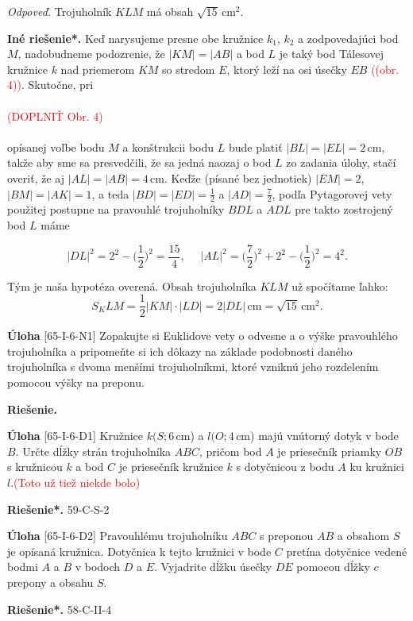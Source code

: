 \documentclass{article}
\newcommand{\rie}{\textbf{Riešenie.} }
\newcommand{\rieh}{\textbf{Riešenie*.} }
\newcommand\todo[1]{\noindent\textcolor{red}{(#1)}}
\newcommand{\problem}[4]{
  \begin{tcolorbox}[breakable,notitle,boxrule=0pt,colback=light-gray,colframe=light-gray]
    \textbf{Úloha}
    [#1] #3
  \end{tcolorbox}
  \noindent#4
}
\begin{document}
{\textit{Odpoveď.} Trojuholník $KLM$ má obsah $\sqrt{15}$\,cm$^2$.

\textbf{Iné riešenie*.} Keď narysujeme presne obe kružnice $k_1$, $k_2$ a zodpovedajúci bod $M$, nadobudneme podozrenie, že $|KM| = |AB|$ a bod $L$ je taký bod Tálesovej kružnice $k$ nad priemerom $KM$ so stredom $E$, ktorý leží na osi úsečky $EB$ \todo{(obr. 4)}. Skutočne, pri\\
\\
\todo{DOPLNIŤ Obr. 4}\\
\\
opísanej voľbe bodu $M$ a konštrukcii bodu $L$ bude platiť $|BL| = |EL| = 2$\,cm, takže aby sme sa presvedčili, že sa jedná naozaj o bod $L$ zo zadania úlohy, stačí overiť, že aj $|AL| = |AB| = 4$\,cm. Keďže (písané bez jednotiek) $|EM| = 2$, $|BM| = |AK| = 1$, a teda $|BD| = |ED| =\frac{1}{2}$ a $|AD| =\frac{7}{2}$, podľa Pytagorovej vety použitej postupne na pravouhlé trojuholníky $BDL$ a $ADL$ pre takto zostrojený bod $L$ máme

$$|DL|^2 = 2^2 - \bigg( \frac{1}{2}\bigg)^2=\frac{15}{4}, \ \ \ \ \ \ |AL|^2=\bigg(\frac{7}{2}\bigg)^2+ 2^2 - \bigg(\frac{1}{2}\bigg)^2= 4^2.$$

Tým je naša hypotéza overená. Obsah trojuholníka $KLM$ už spočítame ľahko:
$$S_KLM =\frac{1}{2}|KM| \cdot |LD| = 2|DL|\,\text{cm} =\sqrt{15}\,\text{cm}^2.$$
}



\problem{65-I-6-N1}{}{
Zopakujte si Euklidove vety o odvesne a o výške pravouhlého trojuholníka a pripomeňte si ich dôkazy na základe podobnosti daného trojuholníka s dvoma menšími trojuholníkmi, ktoré vzniknú jeho rozdelením pomocou výšky na preponu.
}{
\rie
}


\problem{65-I-6-D1}{}{
Kružnice $k(S; 6$\,cm) a $l(O; 4$\,cm) majú vnútorný dotyk v bode $B$. Určte dĺžky strán trojuholníka $ABC$, pričom bod $A$ je priesečník priamky $OB$ s kružnicou $k$ a bod $C$ je priesečník kružnice $k$ s dotyčnicou z bodu $A$ ku kružnici $l$.\todo{Toto už tiež niekde bolo}
}{
\rieh 59-C-S-2
}


\problem{65-I-6-D2}{}{
Pravouhlému trojuholníku $ABC$ s preponou $AB$ a obsahom $S$ je opísaná kružnica. Dotyčnica k tejto kružnici v bode $C$ pretína dotyčnice vedené bodmi $A$ a $B$ v bodoch $D$ a $E$. Vyjadrite dĺžku úsečky $DE$ pomocou dĺžky $c$ prepony a obsahu $S$.
}{
\rieh 58-C-II-4
}
\end{document}

